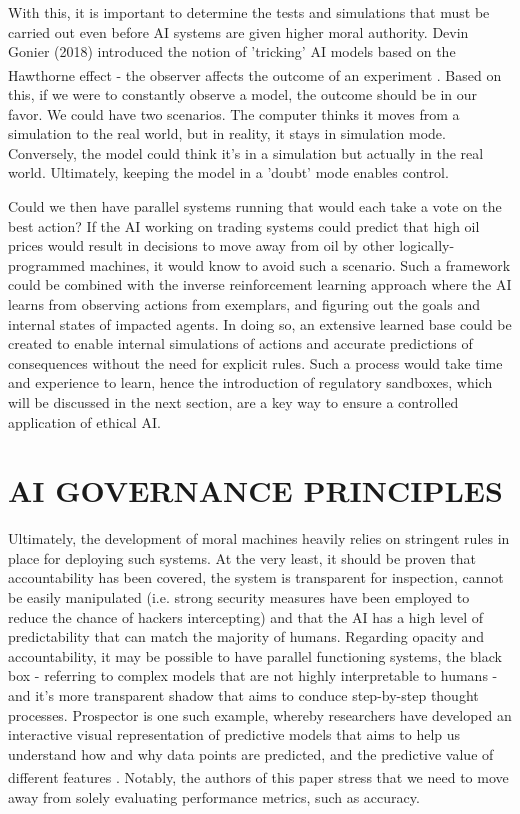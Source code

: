 \documentclass[10pt]{article}
\begin{document}
With this, it is important to determine the tests and simulations that must be carried out even before AI systems are given higher moral authority. Devin Gonier (2018) introduced the notion of 'tricking' AI models based on the Hawthorne effect - the observer affects the outcome of an experiment \textsuperscript{\cite{devin_gonier_morality_2018}}. Based on this, if we were to constantly observe a model, the outcome should be in our favor. We could have two scenarios. The computer thinks it moves from a simulation to the real world, but in reality, it stays in simulation mode. Conversely, the model could think it's in a simulation but actually in the real world. Ultimately, keeping the model in a 'doubt' mode enables control.

Could we then have parallel systems running that would each take a vote on the best action? If the AI working on trading systems could predict that high oil prices would result in decisions to move away from oil by other logically-programmed machines, it would know to avoid such a scenario. Such a framework could be combined with the inverse reinforcement learning approach where the AI learns from observing actions from exemplars, and figuring out the goals and internal states of impacted agents. In doing so, an extensive learned base could be created to enable internal simulations of actions and accurate predictions of consequences without the need for explicit rules. Such a process would take time and experience to learn, hence the introduction of regulatory sandboxes, which will be discussed in the next section, are a key way to ensure a controlled application of ethical AI.

\section{AI GOVERNANCE PRINCIPLES}

Ultimately, the development of moral machines heavily relies on stringent rules in place for deploying such systems. At the very least, it should be proven that accountability has been covered, the system is transparent for inspection, cannot be easily manipulated (i.e. strong security measures have been employed to reduce the chance of hackers intercepting) and that the AI has a high level of predictability that can match the majority of humans.
Regarding opacity and accountability, it may be possible to have parallel functioning systems, the black box - referring to complex models that are not highly interpretable to humans - and it's more transparent shadow that aims to conduce step-by-step thought processes. Prospector is one such example, whereby researchers have developed an interactive visual representation of predictive models that aims to help us understand how and why data points are predicted, and the predictive value of different features \textsuperscript{\cite{krause_interacting_2016}}. Notably, the authors of this paper stress that we need to move away from solely evaluating performance metrics, such as accuracy.
\end{document}
